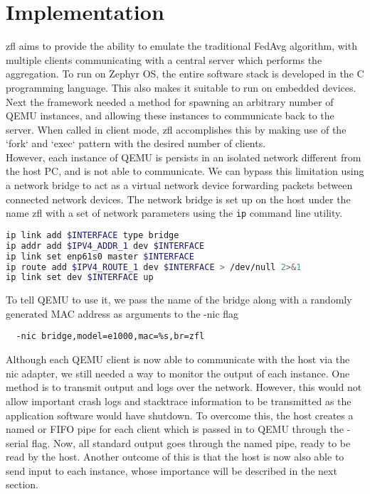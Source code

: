 \documentclass[12pt]{article}
\begin{document}
\section{Implementation}
zfl aims to provide the ability to emulate the traditional FedAvg\cite{} algorithm, with multiple
clients communicating with a central server which performs the aggregation. To run on Zephyr OS, the entire software stack is developed in the C programming language. This also
makes it suitable to run on embedded devices.\\

Next the framework needed a method for spawning an arbitrary number of QEMU instances, and allowing
these instances to communicate back to the server. When called in client mode, zfl accomplishes this
by making use of the `fork` and `exec` pattern with the desired number of clients. \\

However, each instance of QEMU is persists in an isolated network different from the host PC,
and is not able to communicate. We can bypass this limitation using a network bridge to act as a
virtual network device forwarding packets between connected network devices.
The network bridge is set up on the host under the name zfl with a set of network parameters using
the \verb|ip| command line utility.
\begin{lstlisting}[language=bash,caption=Network bridge setup]
ip link add $INTERFACE type bridge
ip addr add $IPV4_ADDR_1 dev $INTERFACE
ip link set enp61s0 master $INTERFACE
ip route add $IPV4_ROUTE_1 dev $INTERFACE > /dev/null 2>&1
ip link set dev $INTERFACE up
\end{lstlisting}
To tell QEMU to use it, we pass the name of the bridge along
with a randomly generated MAC address as arguments to the -nic flag
\begin{verbatim}
  -nic bridge,model=e1000,mac=%s,br=zfl
\end{verbatim}

Although each QEMU client is now able to communicate with the host via the nic adapter, we still
needed a way to monitor the output of each instance. One method is to transmit
output and logs over the network. However, this would not allow important crash logs and stacktrace
information to be transmitted as the application software would have shutdown. To overcome this, the host
creates a named or FIFO pipe \cite{} for each client which is passed in to
QEMU through the -serial flag. Now, all standard output goes through the named pipe, ready to be read
by the host. Another outcome of this is that the host is now also able to send input to each
instance, whose importance will be described in the next section.
\end{document}
